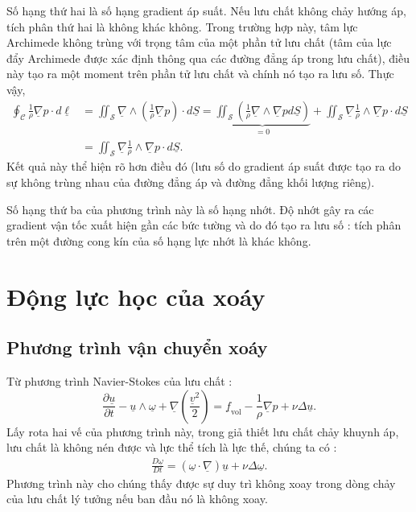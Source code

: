 \documentclass[THUY_DONG_HOC.tex]{subfiles}
\begin{document}
Số hạng thứ hai là số hạng gradient áp suất. Nếu lưu chất không chảy hướng áp, tích phân thứ hai là không khác không. Trong trường hợp này, tâm lực Archimede không trùng với trọng tâm của một phần tử lưu chất (tâm của lực đẩy Archimede được xác định thông qua các đường đẳng áp trong lưu chất), điều này tạo ra một moment trên phần tử lưu chất và chính nó tạo ra lưu số. Thực vậy,
\[
\begin{aligned}
\oint_\mathscr{C} {\frac{1}{\rho } {\underline {\nabla} p}\cdot d\underline \ell }  &= \iint_\mathscr{S} {\underline {\nabla}\wedge\left({\frac{1}{\rho } {\underline {\nabla} p}}\right)\cdot d\underline S}=\underbrace{\iint_\mathscr{S}\left(\frac{1}{\rho}\underline{\nabla}\wedge\underline{\nabla}pd\underline{S}\right) }_{=0}+\iint_\mathscr{S}\underline {\nabla} \frac{1}{\rho } \wedge \underline {\nabla} p \cdot d\underline S\\
&=\iint_\mathscr{S}\underline {\nabla} \frac{1}{\rho } \wedge \underline {\nabla} p \cdot d\underline S.
\end{aligned}
\]
Kết quả này thể hiện rõ hơn điều đó (lưu số do gradient áp suất được tạo ra do sự không trùng nhau của đường đẳng áp và đường đẳng khối lượng riêng).

Số hạng thứ ba của phương trình này là số hạng nhớt. Độ nhớt gây ra các gradient vận tốc xuất hiện gần các bức tường và do đó tạo ra lưu số : tích phân trên một đường cong kín của số hạng lực nhớt là khác không.

\section{Động lực học của xoáy}
\subsection{Phương trình vận chuyển xoáy}
Từ phương trình Navier-Stokes của lưu chất :
$$
	\frac{{\partial\underline u}}{{\partial t}} - \underline u \wedge \underline \omega   + \underline{\nabla}\left( {\frac{{{{\underline v }^2}}}{2}} \right) = \underline f_{\text{vol}}  - \frac{1}{\rho }\underline {\nabla} p + \nu \Delta \underline u.
$$
Lấy rota hai vế của phương trình này, trong giả thiết lưu chất chảy khuynh áp, lưu chất là không nén được và lực thể tích là lực thế, chúng ta có :
\begin{equation}\label{eq:vortex_only}
	\begin{aligned}
		\boxed{
		\frac{{D\underline \omega  }}{{Dt}}= \left( {\underline \omega   \cdot \underline {\nabla} } \right)\underline u  + \nu \Delta \underline \omega
	}.
	\end{aligned}
\end{equation}
Phương trình này cho chúng thấy được sự duy trì không xoay trong dòng chảy của lưu chất lý tưởng nếu ban đầu nó là không xoay. 
\end{document}

